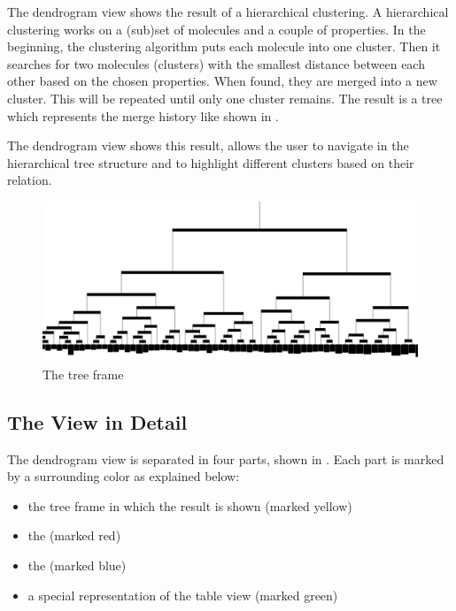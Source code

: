 The dendrogram view shows the result of a hierarchical clustering.
A hierarchical clustering works on a (sub)set of molecules and a couple of properties.
In the beginning, the clustering algorithm puts each molecule into one cluster. Then it searches for two molecules (clusters) with the smallest distance between each other based on the chosen properties.
When found, they are merged into a new cluster. 
This will be repeated until only one cluster remains.
The result is a tree which represents the merge history like shown in .

The dendrogram view shows this result, allows the user to navigate in the hierarchical tree structure and to highlight different clusters based on their relation.

\begin{figure}[!htb]
\centering
\includegraphics[width=1\textwidth]{images/dendrogram/dendrogram}
\caption{The tree frame}
\label{fig:dendrogram_tree}
\end{figure}

\subsection{The View in Detail}

The dendrogram view is separated in four parts, shown in . Each part is marked by a surrounding color as explained below:
\begin{itemize}
\item the tree frame in which the result is shown  (marked yellow)
\item the \sbar (marked red) 
\item the \tbar (marked blue)
\item a special representation of the table view (marked green)
\end{itemize}

